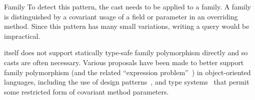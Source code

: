\begin{pattern}{Family}
\detection{}
To detect this pattern, the cast needs to be applied to a family.
A family is distinguished by a covariant usage of a field or parameter in an overriding method.
Since this pattern has many small variations,
writing a \ql{} query would be impractical.

\issues{}
\java{} itself does not support statically type-safe family polymorphism directly and so casts are often necessary.
Various proposals have been made to better support family polymorphism 
(and the related ``expression problem''~\citep{Wadler98ExpressionProblem}) 
in object-oriented languages,
including the use of design patterns~\citep{WangOliveira16ExpressionProblem, oliveiraExtensibilityMasses2012, nystromPolyglotExtensibleCompiler2003},
and type systems~\citep{gbeta, scalaIndependentlyExtensible,
Myers2006SoftwareCW, olivieraDisjointIntersectionTypes,
funWithTypeFunctionsKiselyov09} that
permit some restricted form of covariant method parameters.

\end{pattern}